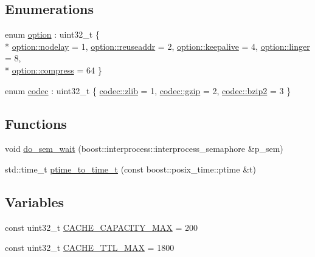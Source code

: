 \subsection*{Enumerations}
\begin{DoxyCompactItemize}
\item 
enum \hyperlink{namespacextd_1_1network_1_1utils_a0acc888a3cdabdadb91fe832ea196a4f}{option} \-: uint32\-\_\-t \{ \\*
\hyperlink{namespacextd_1_1network_1_1utils_a0acc888a3cdabdadb91fe832ea196a4faf0f888198330ff09558650aace4343e3}{option\-::nodelay} = 1, 
\hyperlink{namespacextd_1_1network_1_1utils_a0acc888a3cdabdadb91fe832ea196a4fa087d20314d2967622b76fbf7ce91ebf2}{option\-::reuseaddr} = 2, 
\hyperlink{namespacextd_1_1network_1_1utils_a0acc888a3cdabdadb91fe832ea196a4fa797919b5a9c95dfae9b06cf3086e40c1}{option\-::keepalive} = 4, 
\hyperlink{namespacextd_1_1network_1_1utils_a0acc888a3cdabdadb91fe832ea196a4fafa1711bb276806d1f1808dbb0e31018a}{option\-::linger} = 8, 
\\*
\hyperlink{namespacextd_1_1network_1_1utils_a0acc888a3cdabdadb91fe832ea196a4fa390626c545194d0f20a704589b190994}{option\-::compress} = 64
 \}
\item 
enum \hyperlink{namespacextd_1_1network_1_1utils_a3ac1216ad2037b366cc1f9051a978161}{codec} \-: uint32\-\_\-t \{ \hyperlink{namespacextd_1_1network_1_1utils_a3ac1216ad2037b366cc1f9051a978161a7a990d405d2c6fb93aa8fbb0ec1a3b23}{codec\-::zlib} = 1, 
\hyperlink{namespacextd_1_1network_1_1utils_a3ac1216ad2037b366cc1f9051a978161a749cadba7b2ed8d4a2aaa91a9cb1896c}{codec\-::gzip} = 2, 
\hyperlink{namespacextd_1_1network_1_1utils_a3ac1216ad2037b366cc1f9051a978161a03ce1ba314f367fdd09887fc8f60578b}{codec\-::bzip2} = 3
 \}
\end{DoxyCompactItemize}
\subsection*{Functions}
\begin{DoxyCompactItemize}
\item 
void \hyperlink{namespacextd_1_1network_1_1utils_a181758eb475ef5f4aebfec6c0ebec0c5}{do\-\_\-sem\-\_\-wait} (boost\-::interprocess\-::interprocess\-\_\-semaphore \&p\-\_\-sem)
\item 
std\-::time\-\_\-t \hyperlink{namespacextd_1_1network_1_1utils_aeee4bc5a0636807dd491f21938b7a1ca}{ptime\-\_\-to\-\_\-time\-\_\-t} (const boost\-::posix\-\_\-time\-::ptime \&t)
\end{DoxyCompactItemize}
\subsection*{Variables}
\begin{DoxyCompactItemize}
\item 
const uint32\-\_\-t \hyperlink{namespacextd_1_1network_1_1utils_a8939e806c4a6bc08b78a32941db7a130}{C\-A\-C\-H\-E\-\_\-\-C\-A\-P\-A\-C\-I\-T\-Y\-\_\-\-M\-A\-X} = 200
\item 
const uint32\-\_\-t \hyperlink{namespacextd_1_1network_1_1utils_adb4767541db3a79016a24142db705161}{C\-A\-C\-H\-E\-\_\-\-T\-T\-L\-\_\-\-M\-A\-X} = 1800
\end{DoxyCompactItemize}


